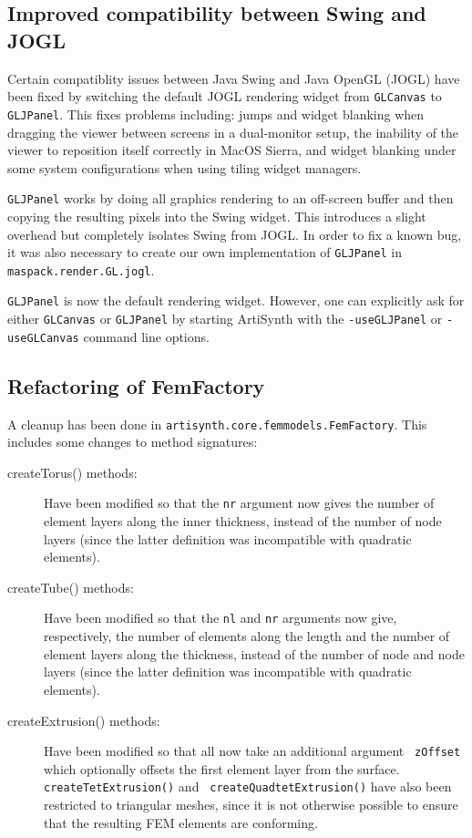 \documentclass{article}
\begin{document}
\subsection*{Improved compatibility between Swing and JOGL}

Certain compatiblity issues between Java Swing and Java OpenGL (JOGL)
have been fixed by switching the default JOGL rendering widget from
{\tt GLCanvas} to {\tt GLJPanel}. This fixes problems including: jumps
and widget blanking when dragging the viewer between screens in a
dual-monitor setup, the inability of the viewer to reposition itself
correctly in MacOS Sierra, and widget blanking under some system
configurations when using tiling widget managers.

{\tt GLJPanel} works by doing all graphics rendering to an off-screen
buffer and then copying the resulting pixels into the Swing widget.
This introduces a slight overhead but completely isolates Swing from
JOGL. In order to fix a known bug, it was also necessary to create our
own implementation of {\tt GLJPanel} in {\tt maspack.render.GL.jogl}.

{\tt GLJPanel} is now the default rendering widget. However, one can
explicitly ask for either {\tt GLCanvas} or {\tt GLJPanel} by starting
ArtiSynth with the {\tt -useGLJPanel} or {\tt -useGLCanvas} command
line options.

\subsection*{Refactoring of FemFactory}

A cleanup has been done in {\tt artisynth.core.femmodels.FemFactory}.
This includes some changes to method signatures:

\begin{description}

\item[createTorus() methods:]\mbox{}

Have been modified so that the {\tt nr} argument now gives the
number of element layers along the inner thickness, instead of the
number of node layers (since the latter definition was incompatible
with quadratic elements).

\item[createTube() methods:]\mbox{}

Have been modified so that the {\tt nl} and {\tt nr} arguments now
give, respectively, the number of elements along the length and the
number of element layers along the thickness, instead of the number of
node and node layers (since the latter definition was incompatible
with quadratic elements).

\item[createExtrusion() methods:]\mbox{}

Have been modified so that all now take an additional argument {\tt
zOffset} which optionally offsets the first element layer from the
surface.  {\tt createTetExtrusion()} and {\tt
createQuadtetExtrusion()} have also been restricted to triangular
meshes, since it is not otherwise possible to ensure that the
resulting FEM elements are conforming.

\end{description}
\end{document}
